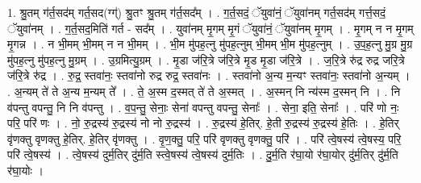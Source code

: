 \documentclass[17pt]{extarticle}
\begin{document}
1. श्रु॒तम् ग॑र्त॒सद॑म् गर्त॒सद(ग्ग्॑) श्रु॒तꣳ श्रु॒तम् ग॑र्त॒सद᳚म् । . ग॒र्त॒सदं॒ ॅयुवा॑नं॒ ॅयुवा॑नम् गर्त॒सद॑म् गर्त्त॒सदं॒ ॅयुवा॑नम् । . ग॒र्त॒सद॒मिति॑ गर्त - सद᳚म् । . युवा॑नम् मृ॒गम् मृ॒गं ॅयुवा॑नं॒ ॅयुवा॑नम् मृ॒गम् । . मृ॒गम् न न मृ॒गम् मृ॒गन्न । . न भी॒मम् भी॒मम् न न भी॒मम् । . भी॒म मु॑पह॒त्नु मु॑पह॒त्नुम् भी॒मम् भी॒म मु॑पह॒त्नुम् । . उ॒प॒ह॒त्नु मु॒ग्र मु॒ग्र मु॑पह॒त्नु मु॑पह॒त्नु मु॒ग्रम् । . उ॒ग्रमित्यु॒ग्रम् । . मृ॒डा ज॑रि॒त्रे ज॑रि॒त्रे मृ॒ड मृ॒डा ज॑रि॒त्रे । . ज॒रि॒त्रे रु॑द्र रुद्र जरि॒त्रे ज॑रि॒त्रे रु॑द्र । . रु॒द्र॒ स्तवा॑नः॒ स्तवा॑नो रुद्र रुद्र॒ स्तवा॑नः । . स्तवा॑नो अ॒न्य म॒न्यꣳ स्तवा॑नः॒ स्तवा॑नो अ॒न्यम् । . अ॒न्यम् ते॑ ते अ॒न्य म॒न्यम् ते᳚ । . ते॒ अ॒स्म द॒स्मत् ते॑ ते अ॒स्मत् । . अ॒स्मन् नि न्य॑स्म द॒स्मन् नि । . नि व॑पन्तु वपन्तु॒ नि नि व॑पन्तु । . व॒प॒न्तु॒ सेनाः॒ सेना॑ वपन्तु वपन्तु॒ सेनाः᳚ । . सेना॒ इति॒ सेनाः᳚ । . परि॑ णो नः॒ परि॒ परि॑ णः । . नो॒ रु॒द्रस्य॑ रु॒द्रस्य॑ नो नो रु॒द्रस्य॑ । . रु॒द्रस्य॑ हे॒तिर्. हे॒ती रु॒द्रस्य॑ रु॒द्रस्य॑ हे॒तिः । . हे॒तिर् वृ॑णक्तु वृणक्तु हे॒तिर्. हे॒तिर् वृ॑णक्तु । . वृ॒ण॒क्तु॒ परि॒ परि॑ वृणक्तु वृणक्तु॒ परि॑ । . परि॑ त्वे॒षस्य॑ त्वे॒षस्य॒ परि॒ परि॑ त्वे॒षस्य॑ । . त्वे॒षस्य॑ दुर्म॒तिर् दु॑र्म॒ति स्त्वे॒षस्य॑ त्वे॒षस्य॑ दुर्म॒तिः । . दु॒र्म॒ति र॑घा॒यो र॑घा॒योर् दु॑र्म॒तिर् दु॑र्म॒ति र॑घा॒योः । \newline
\end{document}
